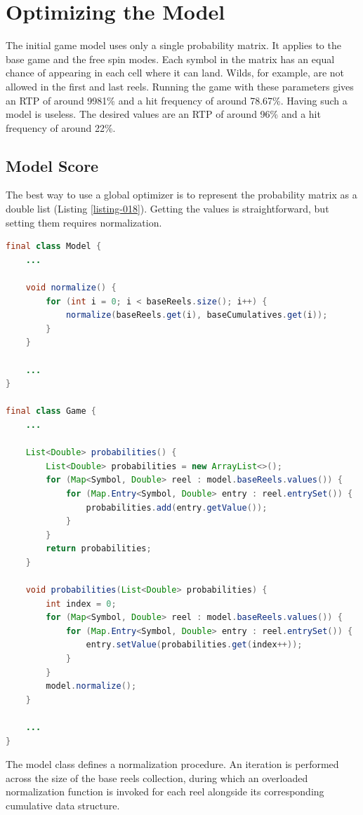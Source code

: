 \documentclass[12pt,twoside,openany]{book}
\begin{document}
\chapter{Optimizing the Model}

The initial game model uses only a single probability matrix. It applies to the base game and the free spin modes. Each symbol in the matrix has an equal chance of appearing in each cell where it can land. Wilds, for example, are not allowed in the first and last reels. Running the game with these parameters gives an RTP of around 9981\% and a hit frequency of around 78.67\%. Having such a model is useless. The desired values are an RTP of around 96\% and a hit frequency of around 22\%.

\section{Model Score}

The best way to use a global optimizer is to represent the probability matrix as a double list (Listing \ref{listing-018}). Getting the values is straightforward, but setting them requires normalization.

\begin{lstlisting}[language=Java, caption={Handling probability matrix}, label=listing-018]
final class Model {
	...

	void normalize() {
		for (int i = 0; i < baseReels.size(); i++) {
			normalize(baseReels.get(i), baseCumulatives.get(i));
		}
	}

	...
}

final class Game {
	...

	List<Double> probabilities() {
		List<Double> probabilities = new ArrayList<>();
		for (Map<Symbol, Double> reel : model.baseReels.values()) {
			for (Map.Entry<Symbol, Double> entry : reel.entrySet()) {
				probabilities.add(entry.getValue());
			}
		}
		return probabilities;
	}

	void probabilities(List<Double> probabilities) {
		int index = 0;
		for (Map<Symbol, Double> reel : model.baseReels.values()) {
			for (Map.Entry<Symbol, Double> entry : reel.entrySet()) {
				entry.setValue(probabilities.get(index++));
			}
		}
		model.normalize();
	}

	...
}
\end{lstlisting}

The model class defines a normalization procedure. An iteration is performed across the size of the base reels collection, during which an overloaded normalization function is invoked for each reel alongside its corresponding cumulative data structure.
\end{document}
